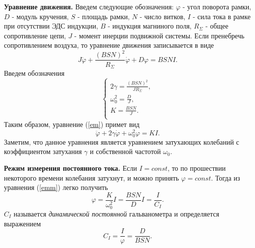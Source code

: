 \documentclass[12pt,a4paper]{article}
\begin{document}
\textbf{Уравнение движения.} Введем следующие обозначения: $\varphi$ - угол поворота рамки, $D$ - модуль кручения, $S$ - площадь рамки, $N$ - число витков, $I$ - сила тока в рамке при отсутствии ЭДС индукции, $B$ - индукция магниного поля, $R_{\Sigma}$ - общее сопротивление цепи, $J$ - момент инерции подвижной системы. Если пренебречь сопротивлением воздуха, то уравнение движения записывается в виде
\begin{equation}
J\ddot\varphi + \frac{(BSN)^2}{R_{\Sigma}}\dot\varphi + D\varphi = BSNI\label{em}.
\end{equation}
Введем обозначения
\begin{equation}
\begin{cases}
2\gamma = \frac{(BSN)^2}{JR_{\Sigma}},\\
\omega_0^2 = \frac{D}{J},\\
K = \frac{BSN}{J}.\\
\end{cases}
\end{equation}
Таким образом, уравнение (\ref{em}) примет вид
\begin{equation}
\ddot\varphi + 2\gamma\dot\varphi + \omega_0^2\varphi = KI\label{emm}.
\end{equation}
Заметим, что данное уравнения является уравнением затухающих колебаний с коэффициентом затухания $\gamma$ и собственной частотой $\omega_0$.
\medskip

\textbf{Режим измерения постоянного тока.} Если $I = const$, то по прошествии некоторого времени колебания затухнут, и можно принять $\varphi = const$. Тогда из уравнения (\ref{emm}) легко получить
\begin{equation}
\varphi = \frac{K}{\omega_0^2}I = \frac{BSN}{D}I = \frac{I}{C_I}.
\end{equation}
$C_I$ называется \textit{динамической постоянной} гальванометра и определяется выражением
\begin{equation}
C_I = \frac{I}{\varphi} = \frac{D}{BSN}.\label{dyn}
\end{equation}
\medskip
\end{document}
